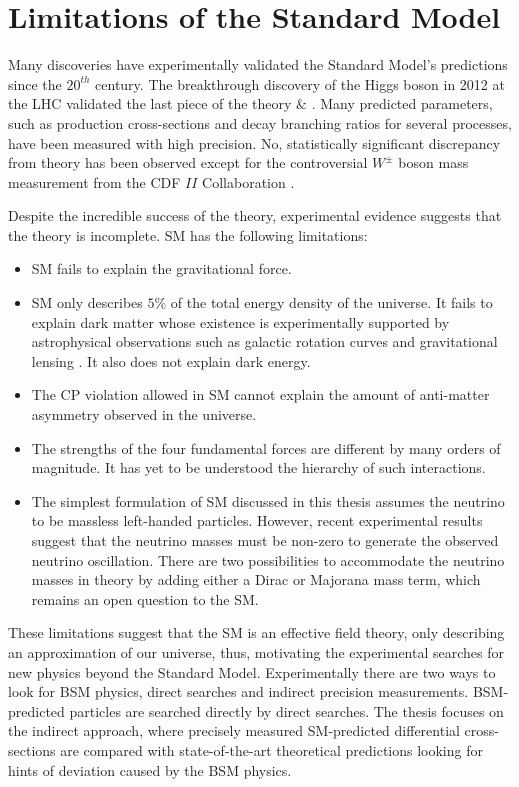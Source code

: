 \section{Limitations of the Standard Model} 
\label{sec:SM_Incomplete}

Many discoveries have experimentally validated the Standard Model's predictions since the $20^{th}$ century. The breakthrough discovery of the Higgs boson in 2012 at the LHC validated the last piece of the theory \cite{CMSHiggsDiscovery}$\&$ \cite{ATLASHiggsDiscovery}. Many predicted parameters, such as production cross-sections and decay branching ratios for several processes, have been measured with high precision. No, statistically significant discrepancy from theory has been observed except for the controversial $W^{\pm}$ boson mass measurement from the CDF $II$ Collaboration \cite{CDFWMass}.

Despite the incredible success of the theory, experimental evidence suggests that the theory is incomplete. SM has the following limitations:

\begin{itemize}

\item{SM fails to explain the gravitational force.}

\item{SM only describes $5\%$ of the total energy density of the universe. It fails to explain dark matter whose existence is experimentally supported by astrophysical observations such as galactic rotation curves and gravitational lensing \cite{DMGravitationalLensing}. It also does not explain dark energy. }

\item{The CP violation allowed in SM cannot explain the amount of anti-matter asymmetry observed in the universe. }

\item{ The strengths of the four fundamental forces are different by many orders of magnitude. It has yet to be understood the hierarchy of such interactions.}

\item{ The simplest formulation of SM discussed in this thesis assumes the neutrino to be massless left-handed particles. However, recent experimental results suggest that the neutrino masses must be non-zero to generate the observed neutrino oscillation\cite{NeutrinoOscillation}. There are two possibilities to accommodate the neutrino masses in theory by adding either a Dirac or Majorana mass term, which remains an open question to the SM. } 

\end{itemize}
 
These limitations suggest that the SM is an effective field theory, only describing an approximation of our universe, thus, motivating the experimental searches for new physics beyond the Standard Model. Experimentally there are two ways to look for BSM physics, direct searches and indirect precision measurements. BSM-predicted particles are searched directly by direct searches. The thesis focuses on the indirect approach, where precisely measured SM-predicted differential cross-sections are compared with state-of-the-art theoretical predictions looking for hints of deviation caused by the BSM physics. 
